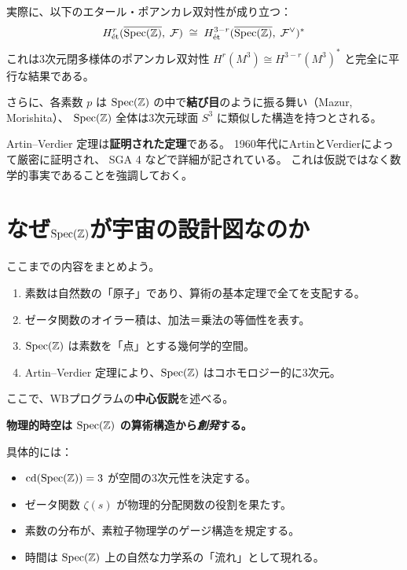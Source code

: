 実際に、以下のエタール・ポアンカレ双対性が成り立つ：
\[
  H^r_{\text{\'et}}(\overline{\operatorname{Spec}(\mathbb{Z})},\; \mathcal{F})
  \;\cong\;
  H^{3-r}_{\text{\'et}}(\overline{\operatorname{Spec}(\mathbb{Z})},\; \mathcal{F}^{\vee})^*
\]
これは3次元閉多様体のポアンカレ双対性
$H^r(M^3) \cong H^{3-r}(M^3)^*$ と完全に平行な結果である。

さらに、各素数 $p$ は $\operatorname{Spec}(\mathbb{Z})$ の中で\textbf{結び目}のように振る舞い（Mazur, Morishita）、
$\operatorname{Spec}(\mathbb{Z})$ 全体は3次元球面 $S^3$ に類似した構造を持つとされる。

\begin{rmk}
Artin--Verdier 定理は\textbf{証明された定理}である。
1960年代にArtinとVerdierによって厳密に証明され、
SGA 4 などで詳細が記されている。
これは仮説ではなく数学的事実であることを強調しておく。
\end{rmk}

\section{なぜ$\operatorname{Spec}(\mathbb{Z})$が宇宙の設計図なのか}
\label{sec:1.5}

ここまでの内容をまとめよう。
\begin{enumerate}
  \item 素数は自然数の「原子」であり、算術の基本定理で全てを支配する。
  \item ゼータ関数のオイラー積は、加法＝乗法の等価性を表す。
  \item $\operatorname{Spec}(\mathbb{Z})$ は素数を「点」とする幾何学的空間。
  \item Artin--Verdier 定理により、$\operatorname{Spec}(\mathbb{Z})$ はコホモロジー的に3次元。
\end{enumerate}

ここで、WBプログラムの\textbf{中心仮説}を述べる。

\begin{hypbox}
\textbf{物理的時空は $\operatorname{Spec}(\mathbb{Z})$ の算術構造から\emph{創発}する。}

具体的には：
\begin{itemize}
  \item $\operatorname{cd}(\operatorname{Spec}(\mathbb{Z})) = 3$ が空間の3次元性を決定する。
  \item ゼータ関数 $\zeta(s)$ が物理的分配関数の役割を果たす。
  \item 素数の分布が、素粒子物理学のゲージ構造を規定する。
  \item 時間は $\operatorname{Spec}(\mathbb{Z})$ 上の自然な力学系の「流れ」として現れる。
\end{itemize}
\end{hypbox}


